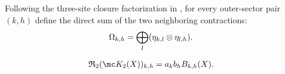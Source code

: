\begin{definition}
    \label{def:mpdo_physical_sector_three_site_neighboring_operator}
    \leanok
    Following the three-site closure factorization in
    \cite[Appendix~C.2, lines~1510--1516]{Cirac2016MPDO_arXiv}, for every
    outer-sector pair $(k,h)$ define the direct sum of the two neighboring
    contractions:
    \begin{align}
        \Omega_{k,h}
         & =\bigoplus_l
        (\eta_{k,l}\otimes\eta_{l,h}).
        \notag
    \end{align}
\end{definition}

\begin{figure}[ht]
    \centering
    \begin{minipage}{0.41\textwidth}
        \centering
        \begin{align}
            \mathfrak R_2(\mc K_2(X))_{k,h}
             & =a_kb_hB_{k,h}(X).
            \notag
        \end{align}
        \begin{center}
            \tenkzkernel
            \begin{tenkz}[rows={wire}, cols=2, west=none, east=none]

\end{tenkz}
\end{center}
\end{minipage}
\end{figure}
